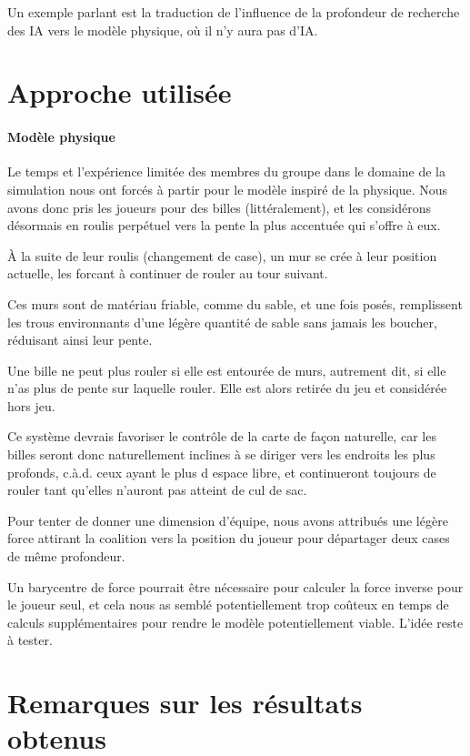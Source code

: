 		Un exemple parlant est la traduction de l'influence de la profondeur de recherche des IA vers le modèle physique, où il n'y aura pas d'IA.
	
	\section{Approche utilisée}
	
		\paragraph{Modèle physique}
		Le temps et l'expérience limitée des membres du groupe dans le domaine de la simulation nous ont forcés à partir pour le modèle inspiré de la physique.
		Nous avons donc pris les joueurs pour des billes (littéralement), et les considérons désormais en roulis perpétuel vers la pente la plus accentuée qui s'offre à eux.
		
		À la suite de leur roulis (changement de case), un mur se crée à leur position actuelle, les forcant à continuer de rouler au tour suivant.
		
		Ces murs sont de matériau friable, comme du sable, et une fois posés, remplissent les trous environnants d'une légère quantité de sable sans jamais les boucher, réduisant ainsi leur pente.
		
		Une bille ne peut plus rouler si elle est entourée de murs, autrement dit, si elle n'as plus de pente sur laquelle rouler.
		Elle est alors retirée du jeu et considérée hors jeu.
		
		Ce système devrais favoriser le contrôle de la carte de façon naturelle, car les billes seront donc naturellement inclines à se diriger vers les endroits les plus profonds, c.à.d. ceux ayant le plus d espace libre, et continueront toujours de rouler tant qu'elles n'auront pas atteint de cul de sac.
		
		Pour tenter de donner une dimension d'équipe, nous avons attribués une légère force attirant la coalition vers la position du joueur pour départager deux cases de même profondeur.
		
		Un barycentre de force pourrait être nécessaire pour calculer la force inverse pour le joueur seul, et cela nous as semblé potentiellement trop coûteux en temps de calculs supplémentaires pour rendre le modèle potentiellement viable.
		L'idée reste à tester.
	
		
	\section{Remarques sur les résultats obtenus}
